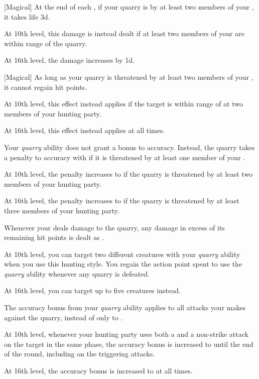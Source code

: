 {            [Magical]
            At the end of each , if your quarry is  by at least two members of your , it takes life  \minus3d.
            \par At 10th level, this damage is instead dealt if at least two members of your  are within \rngmed range of the quarry.
            \par At 16th level, the damage increases by \plus1d.

            [Magical]
            As long as your quarry is threatened by at least two members of your , it cannot regain hit points.
            \par At 10th level, this effect instead applies if the target is within \rngmed range of at two members of your hunting party.
            \par At 16th level, this effect instead applies at all times.

            Your \textit{quarry} ability does not grant a bonus to accuracy.
            Instead, the quarry takes a  penalty to accuracy with  if it is threatened by at least one member of your .
            \par At 10th level, the penalty increases to  if the quarry is threatened by at least two members of your hunting party.
            \par At 16th level, the penalty increases to  if the quarry is threatened by at least three members of your hunting party.

            Whenever your  deals damage to the quarry, any damage in excess of its remaining hit points is dealt as .
            \par At 10th level, you can target two different creatures with your \textit{quarry} ability when you use this hunting style.
            You regain the action point spent to use the \textit{quarry} ability whenever any quarry is defeated. 
            \par At 16th level, you can target up to five creatures instead.

            The accuracy bonus from your \textit{quarry} ability applies to all attacks your  makes against the quarry, instead of only to .
            \par At 10th level, whenever your hunting party uses both a  and a non-strike attack on the target in the same phase, the accuracy bonus is increased to  until the end of the round, including on the triggering attacks.
            \par At 16th level, the accuracy bonus is increased to  at all times.

}
